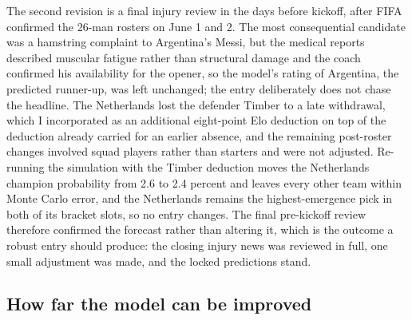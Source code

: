\documentclass[11pt,letterpaper]{article}
\begin{document}
The second revision is a final injury review in the days before kickoff, after FIFA confirmed the 26-man rosters on June 1 and 2. The most consequential candidate was a hamstring complaint to Argentina's Messi, but the medical reports described muscular fatigue rather than structural damage and the coach confirmed his availability for the opener, so the model's rating of Argentina, the predicted runner-up, was left unchanged; the entry deliberately does not chase the headline. The Netherlands lost the defender Timber to a late withdrawal, which I incorporated as an additional eight-point Elo deduction on top of the deduction already carried for an earlier absence, and the remaining post-roster changes involved squad players rather than starters and were not adjusted. Re-running the simulation with the Timber deduction moves the Netherlands champion probability from 2.6 to 2.4 percent and leaves every other team within Monte Carlo error, and the Netherlands remains the highest-emergence pick in both of its bracket slots, so no entry changes. The final pre-kickoff review therefore confirmed the forecast rather than altering it, which is the outcome a robust entry should produce: the closing injury news was reviewed in full, one small adjustment was made, and the locked predictions stand.

\subsection{How far the model can be improved}\label{sec:audit}
\end{document}
